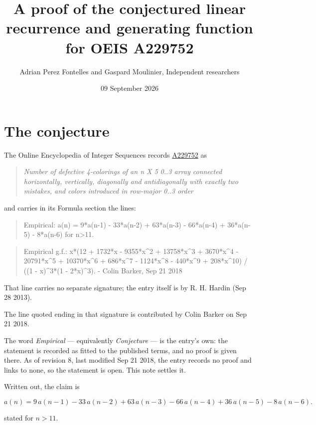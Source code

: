 \documentclass[11pt]{article}
\title{A proof of the conjectured linear recurrence and generating function for OEIS A229752}
\author{Adrian Perez Fontelles and Gaspard Moulinier, Independent researchers}
\date{09 September 2026}
\theoremstyle{definition}
\begin{document}
\maketitle
\section{The conjecture}

The Online Encyclopedia of Integer Sequences records \href{https://oeis.org/A229752}{A229752} as

\begin{quote}\itshape Number of defective 4-colorings of an n X 5 0..3 array connected horizontally, vertically, diagonally and antidiagonally with exactly two mistakes, and colors introduced in row-major 0..3 order\end{quote}

and carries in its Formula section the lines:

\begin{quote}\ttfamily Empirical: a(n) = 9*a(n-1) - 33*a(n-2) + 63*a(n-3) - 66*a(n-4) + 36*a(n-5) - 8*a(n-6) for n>11.\end{quote}

\begin{quote}\ttfamily Empirical g.f.: x*(12 + 1732*x - 9355*x\textasciicircum{}2 + 13758*x\textasciicircum{}3 + 3670*x\textasciicircum{}4 - 20791*x\textasciicircum{}5 + 10370*x\textasciicircum{}6 + 686*x\textasciicircum{}7 - 1124*x\textasciicircum{}8 - 440*x\textasciicircum{}9 + 208*x\textasciicircum{}10) / ((1 - x)\textasciicircum{}3*(1 - 2*x)\textasciicircum{}3). - Colin Barker, Sep 21 2018\end{quote}

That line carries no separate signature; the entry itself is by R. H. Hardin (Sep 28 2013).

The line quoted ending in that signature is contributed by Colin Barker on Sep 21 2018.

The word {\itshape Empirical} --- equivalently {\itshape Conjecture} --- is the entry's own: the statement is recorded as fitted to the published terms, and no proof is given there. As of revision 8, last modified Sep 21 2018, the entry records no proof and links to none, so the statement is open. This note settles it.

Written out, the claim is

\[a(n) = 9\,a(n-1) - 33\,a(n-2) + 63\,a(n-3) - 66\,a(n-4) + 36\,a(n-5) - 8\,a(n-6).\]

stated for $n > 11$.
\end{document}
